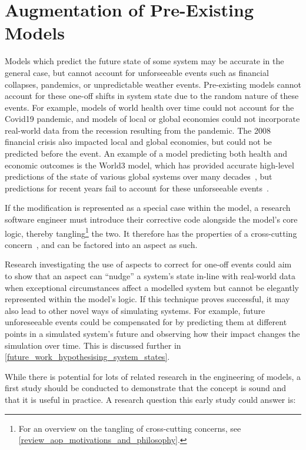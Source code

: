 \section{Augmentation of Pre-Existing Models}
\label{future_work_nudge_model_state}
\label{future_work_using_aspects_to_correct_simulated_state}

Models which predict the future state of some system may be accurate in the
general case,
but cannot account for unforseeable events such as financial collapses,
pandemics, or unpredictable weather events. Pre-existing models cannot account
for these one-off shifts in system state due to the random nature of these events. For
example, models of world health over time could not account for the Covid19
pandemic, and models of local or global economies could not incorporate
real-world data from the recession resulting from the pandemic. The 2008
financial crisis also impacted local and global economies, but could not be
predicted before the event. An example of a model predicting both health and
economic outcomes is the World3 model, which has
provided accurate high-level predictions of the state of various global systems
over many decades~\cite{branderhorst2020update}, but predictions for
recent years fail to account for these unforseeable events~\cite{nebelrecalibration}.

If the modification is represented as a special case within the model, a
research software engineer must introduce their corrective code alongside the
model's core logic, thereby tangling\footnote{For an overview on the tangling of
cross-cutting concerns, see \cref{review_aop_motivations_and_philosophy}.} the
two. It therefore has the properties of a cross-cutting
concern~\cite{kiczales1997aspect,filman2000aspect}, and can be factored into an
aspect as such. 

Research investigating the use of aspects to correct for one-off events could
aim to show that an aspect can ``nudge'' a system's state in-line with
real-world data when exceptional circumstances affect a modelled system but
cannot be elegantly represented within the model's logic. 
If this technique proves successful, it may also lead to other novel ways of
simulating systems. For example, future unforeseeable events could be
compensated for by predicting them at different points in a simulated system's
future and observing how their impact changes the simulation over time. This is
discussed further in \cref{future_work_hypothesising_system_states}.

While there is potential for lots of related research in the engineering of
models, a first study should be conducted to demonstrate that the concept is
sound and that it is useful in practice. A research question
this early study could answer is:

